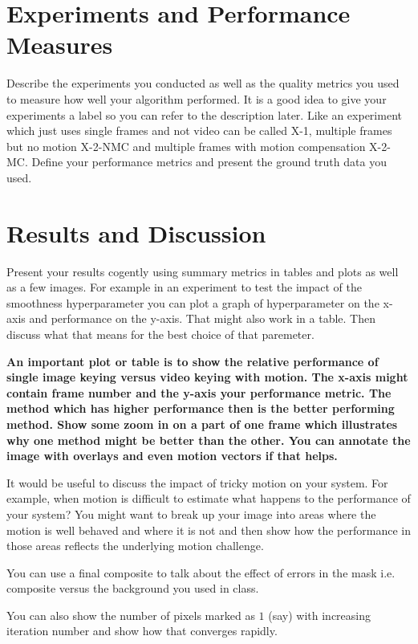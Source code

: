 \documentclass[conference]{IEEEtran}
\begin{document}
\section{Experiments and Performance Measures}
Describe the experiments you conducted as well as the quality metrics you used to measure how well your algorithm performed. It is a good idea to give your experiments a label so you can refer to the description later. Like an experiment which just uses single frames and not video can be called X-1, multiple frames but no motion X-2-NMC and multiple frames with motion compensation X-2-MC. Define your performance metrics and present the ground truth data you used. 

\section{Results and Discussion}
Present your results cogently using summary metrics in tables and plots as well as a few images. For example in an experiment to test the impact of the smoothness hyperparameter you can plot a graph of hyperparameter on the x-axis and performance on the y-axis. That might also work in a table. Then discuss what that means for the best choice of that paremeter. 


{\bf An important plot or table is to show the relative performance of single image keying versus video keying with motion. The x-axis might contain frame number and the y-axis your performance metric. The method which has higher performance then is the better performing method. Show some zoom in on a part of one frame which illustrates why one method might be better than the other. You can annotate the image with overlays and even motion vectors if that helps.}

It would be useful to discuss the impact of tricky motion on your system. For example, when motion is difficult to estimate what happens to the performance of your system? You might want to break up your image into areas where the motion is well behaved and where it is not and then show how the performance in those areas reflects the underlying motion challenge. 

You can use a final composite to talk about the effect of errors in the mask i.e. composite versus the background you used in class. 

You can also show the number of pixels marked as $1$ (say) with increasing iteration number and show how that converges rapidly. 
\end{document}
